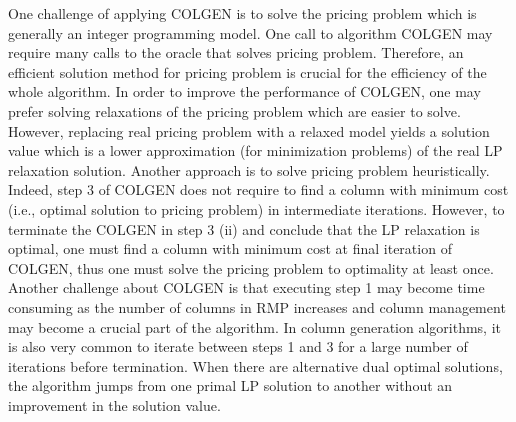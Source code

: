 One challenge of applying COLGEN is to solve the pricing problem which is generally
an integer programming model. One call to algorithm COLGEN may require many 
calls to the oracle that solves pricing problem. Therefore, an efficient solution method 
for pricing problem is crucial for the efficiency of the whole algorithm.   
In order to improve the performance of COLGEN,
one may prefer solving relaxations of the pricing problem which are easier to solve. 
However, replacing real pricing problem with a relaxed model yields a solution value
which is a lower approximation (for minimization problems) of the real LP relaxation 
solution. Another approach is to solve pricing problem heuristically. Indeed, step 3
of COLGEN does not require to find a column with  minimum cost (i.e., optimal solution 
to pricing problem) in intermediate iterations. However, to terminate the COLGEN 
in step 3 (ii) and conclude that the LP relaxation is optimal, one must find
a column with minimum cost at final iteration of COLGEN, thus one must solve
the pricing problem to optimality at least once.        
Another challenge about COLGEN is that executing step 1 may become time consuming
as the number of columns in RMP increases and column management may become a crucial part
of the algorithm. In column generation algorithms, it is also very common 
to iterate between steps 1 and 3 for a large number of iterations before termination. 
When there are alternative dual optimal solutions, the algorithm
jumps from one primal LP solution to another without an improvement in the
solution value.  

